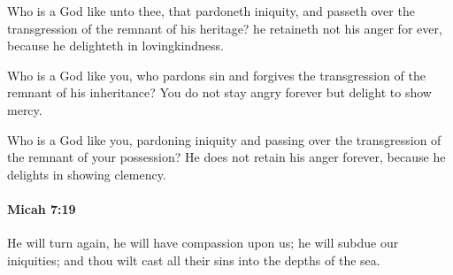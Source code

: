 			\begin{versebox}
					\item[BHS] 
					\item[LXX] 
					\item[ASV] Who is a God like unto thee, that pardoneth iniquity, and passeth over the transgression of the remnant of his heritage? he retaineth not his anger for ever, because he delighteth in lovingkindness.
					\item[NIV] Who is a God like you, who pardons sin and forgives the transgression of the remnant of his inheritance? You do not stay angry forever but delight to show mercy.
					\item[NRSV] Who is a God like you, pardoning iniquity and passing over the transgression of the remnant of your possession? He does not retain his anger forever, because he delights in showing clemency.
			\end{versebox}

		\paragraph{Micah 7:19} %
			\label{MICAH-7-19}

			He will turn again, he will have compassion upon us; he will subdue our iniquities; and thou wilt cast all their sins into the depths of the sea.


